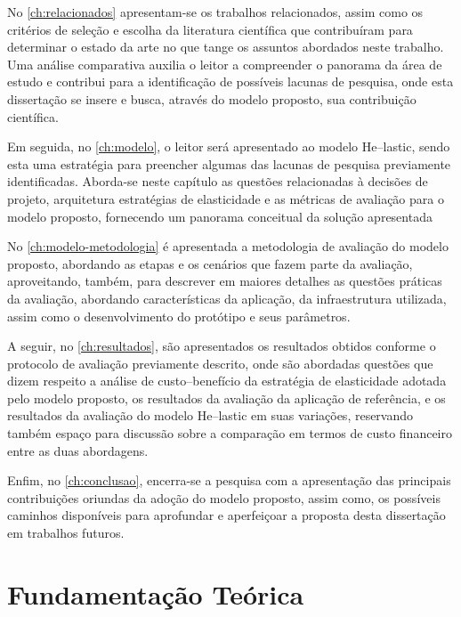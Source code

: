 \documentclass[english,brazilian]{UNISINOSmonografia} %
\begin{document}
No \autoref{ch:relacionados} apresentam-se os trabalhos relacionados, assim como os critérios de seleção e escolha da literatura científica que contribuíram para determinar o estado da arte no que tange os assuntos abordados neste trabalho.
Uma análise comparativa auxilia o leitor a compreender o panorama da área de estudo e contribui para a identificação de possíveis lacunas de pesquisa, onde esta dissertação se insere e busca, através do modelo proposto, sua contribuição científica.


Em seguida, no \autoref{ch:modelo}, o leitor será apresentado ao modelo \textsf{He}--lastic, sendo esta uma estratégia para preencher algumas das lacunas de pesquisa previamente identificadas. Aborda-se neste capítulo as questões relacionadas à decisões de projeto, arquitetura estratégias de elasticidade e as métricas de avaliação para o modelo proposto, fornecendo um panorama conceitual da solução apresentada


No \autoref{ch:modelo-metodologia} é apresentada a metodologia de avaliação do modelo proposto, abordando as etapas e os cenários que fazem parte da avaliação, aproveitando, também, para descrever em maiores detalhes as questões práticas da avaliação, abordando características da aplicação, da infraestrutura utilizada, assim como o desenvolvimento do protótipo e seus parâmetros.


A seguir, no \autoref{ch:resultados}, são apresentados os resultados obtidos conforme o protocolo de avaliação previamente descrito, onde são abordadas questões que dizem respeito a análise de custo--benefício da estratégia de elasticidade adotada pelo modelo proposto, os resultados da avaliação da aplicação de referência, e os resultados da avaliação do modelo \textsf{He}--lastic em suas variações, reservando também espaço para discussão sobre a comparação em termos de custo financeiro entre as duas abordagens.


Enfim, no \autoref{ch:conclusao}, encerra-se a pesquisa com a apresentação das principais contribuições oriundas da adoção do modelo proposto, assim como, os possíveis caminhos disponíveis para aprofundar e aperfeiçoar a proposta desta dissertação em trabalhos futuros.


\chapter{Fundamentação Teórica}
\label{ch:fundamentacao}
\end{document}
